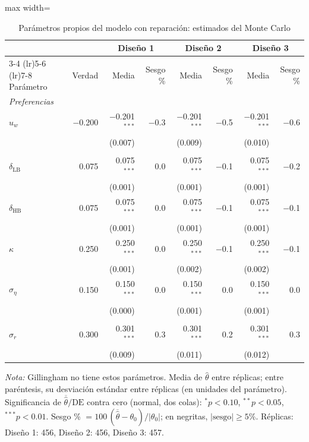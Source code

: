 \begin{table}[htbp]
\centering
\small
\setlength{\tabcolsep}{4.5pt}
\begin{adjustbox}{max width=\textwidth}
\begin{tabular}{l r rr rr rr}
\toprule
 & & \multicolumn{2}{c}{Diseño 1} & \multicolumn{2}{c}{Diseño 2} & \multicolumn{2}{c}{Diseño 3}\\
\cmidrule(lr){3-4} \cmidrule(lr){5-6} \cmidrule(lr){7-8}
Parámetro & Verdad & Media & Sesgo \% & Media & Sesgo \% & Media & Sesgo \%\\
\midrule
\multicolumn{8}{l}{\textit{Preferencias}}\\
$u_w$ & $-$0.200 & $-$0.201$^{***}$ & $-$0.3 & $-$0.201$^{***}$ & $-$0.5 & $-$0.201$^{***}$ & $-$0.6\\
 &  & (0.007) &  & (0.009) &  & (0.010) & \\[1pt]
\addlinespace
\multicolumn{8}{l}{\textit{Desgaste}}\\
$\delta_{\text{LB}}$ & 0.075 & 0.075$^{***}$ & 0.0 & 0.075$^{***}$ & $-$0.1 & 0.075$^{***}$ & $-$0.2\\
 &  & (0.001) &  & (0.001) &  & (0.001) & \\[1pt]
$\delta_{\text{HB}}$ & 0.075 & 0.075$^{***}$ & 0.0 & 0.075$^{***}$ & $-$0.1 & 0.075$^{***}$ & $-$0.1\\
 &  & (0.001) &  & (0.001) &  & (0.001) & \\[1pt]
$\kappa$ & 0.250 & 0.250$^{***}$ & 0.0 & 0.250$^{***}$ & $-$0.1 & 0.250$^{***}$ & $-$0.1\\
 &  & (0.001) &  & (0.002) &  & (0.002) & \\[1pt]
$\sigma_\eta$ & 0.150 & 0.150$^{***}$ & 0.0 & 0.150$^{***}$ & 0.0 & 0.150$^{***}$ & 0.0\\
 &  & (0.000) &  & (0.001) &  & (0.001) & \\[1pt]
\addlinespace
\multicolumn{8}{l}{\textit{Reparación}}\\
$\sigma_r$ & 0.300 & 0.301$^{***}$ & 0.3 & 0.301$^{***}$ & 0.2 & 0.301$^{***}$ & 0.3\\
 &  & (0.009) &  & (0.011) &  & (0.012) & \\[1pt]
\bottomrule
\end{tabular}
\end{adjustbox}
\caption{Parámetros propios del modelo con reparación: estimados del Monte Carlo}
\label{tab:mc-propios}
\par\smallskip
\begin{minipage}{\textwidth}\footnotesize
\textit{Nota:} Gillingham no tiene estos parámetros. Media de $\hat\theta$ entre réplicas;
entre paréntesis, su desviación estándar entre réplicas (en unidades del parámetro).
Significancia de $\overline{\hat\theta}/\text{DE}$ contra cero (normal, dos colas):
$^{*}p<0.10$, $^{**}p<0.05$, $^{***}p<0.01$.
Sesgo \% $=100\,(\overline{\hat\theta}-\theta_0)/|\theta_0|$; en negritas, $|\text{sesgo}|\ge5\%$.
Réplicas: Diseño 1: 456, Diseño 2: 456, Diseño 3: 457.
\end{minipage}
\end{table}
